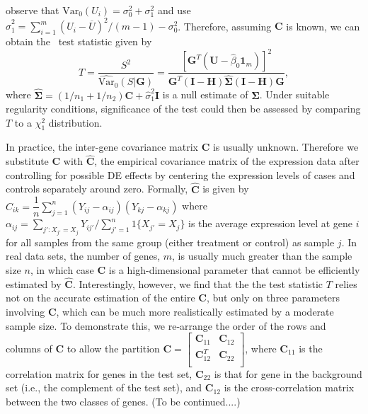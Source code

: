 	observe
	that $\mbox{Var}_{0}(U_i)=\sigma_0^2+\sigma_1^2$ and use
	$\hat\sigma_1^2=\sum_{i=1}^m(U_i-\overline{U})^2/(m-1)-\sigma_0^2$. Therefore, assuming $\bm C$ 
	is
	known, we can obtain the \OurMethod~test statistic given by
	\begin{equation}\label{eq:meqleastat}
	T = \dfrac{S^2}{\widehat{\mbox{Var}}_{0}(S|\bm G)} = \dfrac{[\bm G^T(\bm U-\hat\beta_0\bm
		1_m)]^2}{\bm G^T(\bm I-\bm H)\hat{\bm\Sigma}(\bm I-\bm H)\bm G}, 
	\end{equation}
	where $\hat{\bm\Sigma}=(1/n_1+1/n_2)\bm C+\hat\sigma_1^2\bm I$ is a null estimate of $\bm 
	\Sigma$.
	Under suitable regularity conditions, significance of the test could then be assessed by 
	comparing
	$T$ to a $\chi^2_1$ distribution.
	
	In practice, the inter-gene covariance matrix $\bm C$ is usually unknown. Therefore we 
	substitute $\bm C$
	with $\hat {\bm C}$, the empirical covariance matrix of the expression data after controlling 
	for
	possible DE effects by centering the expression levels of cases and controls separately around
	zero. Formally, $\hat {\bm C}$ is given by $\hat
	C_{ik}=\dfrac{1}{n}\sum_{j=1}^n(Y_{ij}-\alpha_{ij})(Y_{kj}-\alpha_{kj})$ where
	$\alpha_{ij}=\sum_{j':X_{j'}=X_{j}}Y_{ij'}/\sum_{j'=1}^n1\{X_{j'}=X_{j}\}$ is the average 
	expression
	level at gene $i$ for all samples from the same group (either treatment or control) as sample 
	$j$.
	In real data sets, the number of genes, $m$, is usually much greater than the sample size $n$, 
	in
	which case $\bm C$ is a high-dimensional parameter that cannot be efficiently estimated by $\hat
	{\bm C}$. Interestingly, however, we find that the the test statistic $T$ relies not on
	the accurate estimation of the entire $\bm C$, but only on three parameters involving $\bm C$, 
	which
	can be much more realistically estimated by a moderate sample size. To demonstrate this, we
	re-arrange the order of the rows and columns of $\bm C$ to allow the partition $\bm
	C=\left[\begin{array}{cc}
	\bm C_{11} & \bm C_{12} \\       \bm C_{12}^T & \bm C_{22} \\      \end{array}\right] $,
	where $\bm C_{11}$ is the correlation matrix for genes in the test set, $\bm C_{22}$ is that for
	gene in the background set (i.e., the complement of the test set), and $\bm C_{12}$ is the
	cross-correlation matrix between the two classes of genes. (To be continued....)
	
